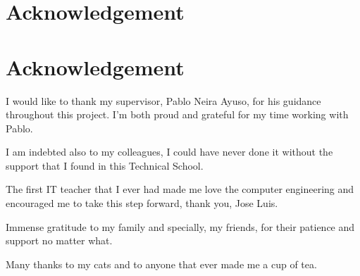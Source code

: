 \chapter*{Acknowledgement}
\chapter*{Acknowledgement}
I would like to thank my supervisor, Pablo Neira Ayuso, for his guidance throughout this project. I’m both proud and grateful for my time working with Pablo.

I am indebted also to my colleagues, I could have never done it without the support that I found in this Technical School.


The first IT teacher that I ever had made me love the computer engineering and encouraged me to take this step forward, thank you, Jose Luis.

Immense gratitude to my family and specially, my friends, for their patience and support no matter what.

Many thanks to my cats and to anyone that ever made me a cup of tea.
